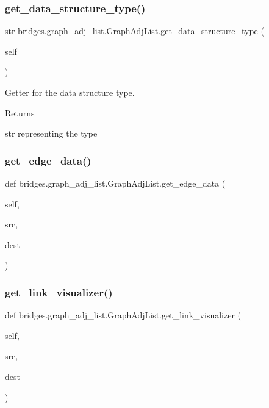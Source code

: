 \subsubsection{\texorpdfstring{get\_data\_structure\_type()}{get\_data\_structure\_type()}}
{\footnotesize\ttfamily  str bridges.\+graph\+\_\+adj\+\_\+list.\+Graph\+Adj\+List.\+get\+\_\+data\+\_\+structure\+\_\+type (\begin{DoxyParamCaption}\item[{}]{self }\end{DoxyParamCaption})}



Getter for the data structure type. 

\begin{DoxyReturn}{Returns}


str representing the type 
\end{DoxyReturn}
\mbox{\label{classbridges_1_1graph__adj__list_1_1_graph_adj_list_abf7a65867ab342ef0eda4a34b3fe011e}} 
\subsubsection{\texorpdfstring{get\_edge\_data()}{get\_edge\_data()}}
{\footnotesize\ttfamily def bridges.\+graph\+\_\+adj\+\_\+list.\+Graph\+Adj\+List.\+get\+\_\+edge\+\_\+data (\begin{DoxyParamCaption}\item[{}]{self,  }\item[{}]{src,  }\item[{}]{dest }\end{DoxyParamCaption})}

\mbox{\label{classbridges_1_1graph__adj__list_1_1_graph_adj_list_abaa3015ae78e0f5ebc6fd2d2d2772927}} 
\subsubsection{\texorpdfstring{get\_link\_visualizer()}{get\_link\_visualizer()}}
{\footnotesize\ttfamily def bridges.\+graph\+\_\+adj\+\_\+list.\+Graph\+Adj\+List.\+get\+\_\+link\+\_\+visualizer (\begin{DoxyParamCaption}\item[{}]{self,  }\item[{}]{src,  }\item[{}]{dest }\end{DoxyParamCaption})}

